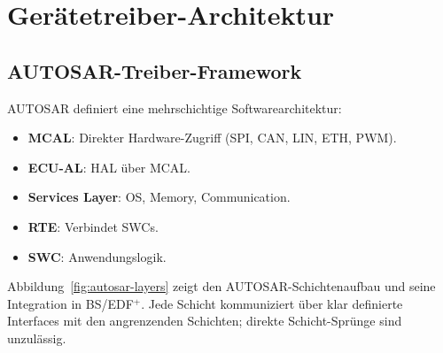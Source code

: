 ﻿\documentclass[a4paper,12pt]{scrreprt}
\theoremstyle{definition}
\begin{document}
	\chapter{Gerätetreiber-Architektur}
	
	\section{AUTOSAR-Treiber-Framework}

	AUTOSAR \cite{AUTOSAR2023} definiert eine mehrschichtige Softwarearchitektur:
	\begin{itemize}
		\item \textbf{MCAL}: Direkter Hardware-Zugriff (SPI, CAN, LIN, ETH, PWM).
		\item \textbf{ECU-AL}: HAL über MCAL.
		\item \textbf{Services Layer}: OS, Memory, Communication.
		\item \textbf{RTE}: Verbindet SWCs.
		\item \textbf{SWC}: Anwendungslogik.
	\end{itemize}

	Abbildung~\ref{fig:autosar-layers} zeigt den AUTOSAR-Schichtenaufbau und
	seine Integration in BS/EDF$^+$. Jede Schicht kommuniziert über klar
	definierte Interfaces mit den angrenzenden Schichten; direkte Schicht-Sprünge
	sind unzulässig.
\end{document}
